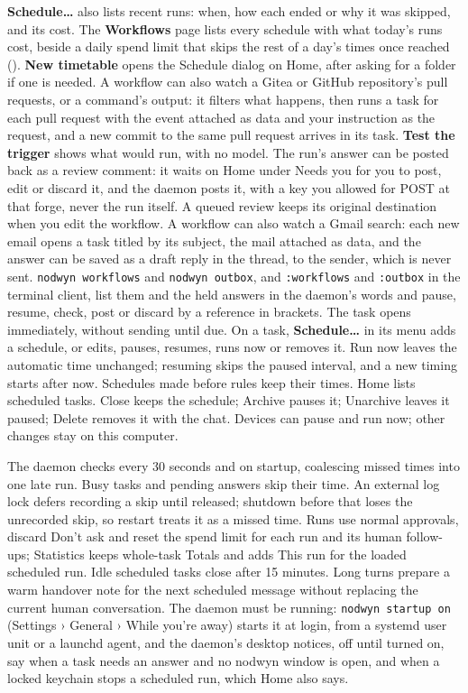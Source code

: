 \textbf{Schedule\ldots} also lists recent runs: when, how each ended or why
it was skipped, and its cost. The \textbf{Workflows} page lists every
schedule with what today's runs cost, beside a daily spend limit that skips
the rest of a day's times once reached (). \textbf{New timetable}
opens the Schedule dialog on Home, after asking for a folder if one is needed.
A workflow can also watch
a Gitea or GitHub repository's pull requests, or a command's output: it
filters what happens, then runs a task for each pull request with the event
attached as data and your instruction as the request, and a new commit to the
same pull request arrives in its task. \textbf{Test the trigger} shows what
would run, with no model. The run's answer can be posted back as a review
comment: it waits on Home under Needs you for you to post, edit or discard it,
and the daemon posts it, with a key you allowed for POST at that forge, never
the run itself. A queued review keeps its original destination when you edit the workflow. A workflow can also watch a Gmail search: each new email opens a
task titled by its subject, the mail attached as data, and the answer can be
saved as a draft reply in the thread, to the sender, which is never sent.
\texttt{nodwyn workflows} and \texttt{nodwyn outbox}, and \texttt{:workflows}
and \texttt{:outbox} in the terminal client, list them and the held answers in the
daemon's words and pause, resume, check, post or discard by a reference in
brackets.
The task opens immediately, without sending until due. On a task,
\textbf{Schedule\ldots} in its menu adds a schedule, or edits,
pauses, resumes, runs now or removes it. Run now leaves the automatic time
unchanged; resuming skips the paused interval, and a new timing starts after
now. Schedules made before rules keep their times. Home lists scheduled tasks.
Close keeps the schedule; Archive pauses it; Unarchive leaves it paused;
Delete removes it with the chat. Devices can pause and run now; other changes
stay on this computer.

The daemon checks every 30 seconds and on startup, coalescing missed times
into one late run. Busy tasks and pending answers skip their time. An external
log lock defers recording a skip until released; shutdown before that loses
the unrecorded skip, so restart treats it as a missed time. Runs use normal
approvals, discard Don't ask and reset the spend limit for each run and its
human follow-ups; Statistics keeps whole-task Totals and adds This run for the loaded scheduled run. Idle scheduled tasks close after 15 minutes. Long turns prepare a warm
handover note for the next scheduled message without replacing the current
human conversation. The daemon must be running: \texttt{nodwyn startup on}
(Settings › General › While you're away) starts it at login, from a systemd
user unit or a launchd agent, and the daemon's desktop notices, off until
turned on, say when a task needs an answer and no nodwyn window is open, and
when a locked keychain stops a scheduled run, which Home also says.

